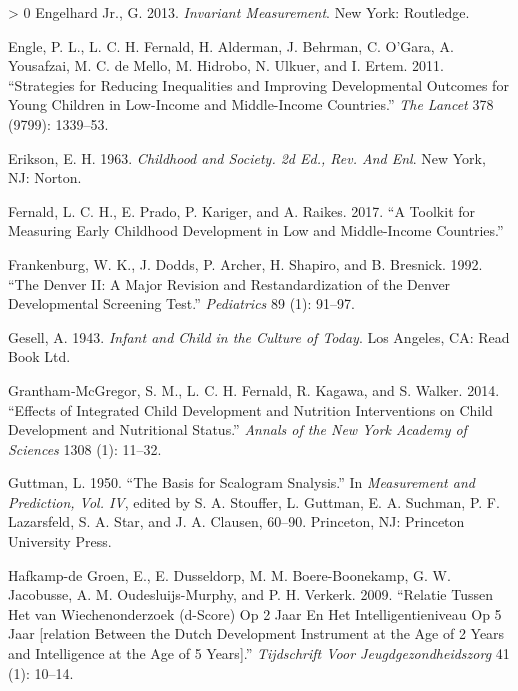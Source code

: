\documentclass[
]{book}
\newlength{\cslhangindent}
\newenvironment{CSLReferences}[3] %
 {%
  \setlength{\parindent}{0pt}
  \ifodd #1 \everypar{\setlength{\hangindent}{\cslhangindent}}\ignorespaces\fi
  \ifnum #2 > 0
  \setlength{\parskip}{#2\baselineskip}
  \fi
 }%
 {}
\begin{document}
\begin{CSLReferences}{1}{0}
\leavevmode\hypertarget{ref-engelhard2013}{}%
Engelhard Jr., G. 2013. \emph{Invariant Measurement}. New York: Routledge.

\leavevmode\hypertarget{ref-engle2011}{}%
Engle, P. L., L. C. H. Fernald, H. Alderman, J. Behrman, C. O'Gara, A. Yousafzai, M. C. de Mello, M. Hidrobo, N. Ulkuer, and I. Ertem. 2011. {``Strategies for Reducing Inequalities and Improving Developmental Outcomes for Young Children in Low-Income and Middle-Income Countries.''} \emph{The Lancet} 378 (9799): 1339--53.

\leavevmode\hypertarget{ref-erikson1963}{}%
Erikson, E. H. 1963. \emph{Childhood and Society. 2d Ed., Rev. And Enl}. New York, NJ: Norton.

\leavevmode\hypertarget{ref-fernald2017toolkit}{}%
Fernald, L. C. H., E. Prado, P. Kariger, and A. Raikes. 2017. {``A Toolkit for Measuring Early Childhood Development in Low and Middle-Income Countries.''}

\leavevmode\hypertarget{ref-frankenburg1992}{}%
Frankenburg, W. K., J. Dodds, P. Archer, H. Shapiro, and B. Bresnick. 1992. {``The Denver II: A Major Revision and Restandardization of the Denver Developmental Screening Test.''} \emph{Pediatrics} 89 (1): 91--97.

\leavevmode\hypertarget{ref-gesell1943}{}%
Gesell, A. 1943. \emph{Infant and Child in the Culture of Today}. Los Angeles, CA: Read Book Ltd.

\leavevmode\hypertarget{ref-grantham2014}{}%
Grantham‐McGregor, S. M., L. C. H. Fernald, R. Kagawa, and S. Walker. 2014. {``Effects of Integrated Child Development and Nutrition Interventions on Child Development and Nutritional Status.''} \emph{Annals of the New York Academy of Sciences} 1308 (1): 11--32.

\leavevmode\hypertarget{ref-guttman1950}{}%
Guttman, L. 1950. {``The Basis for Scalogram Snalysis.''} In \emph{Measurement and Prediction, Vol. IV}, edited by S. A. Stouffer, L. Guttman, E. A. Suchman, P. F. Lazarsfeld, S. A. Star, and J. A. Clausen, 60--90. Princeton, NJ: Princeton University Press.

\leavevmode\hypertarget{ref-hafkamp2009}{}%
Hafkamp-de Groen, E., E. Dusseldorp, M. M. Boere-Boonekamp, G. W. Jacobusse, A. M. Oudesluijs-Murphy, and P. H. Verkerk. 2009. {``Relatie Tussen Het van Wiechenonderzoek (d-Score) Op 2 Jaar En Het Intelligentieniveau Op 5 Jaar {[}relation Between the Dutch Development Instrument at the Age of 2 Years and Intelligence at the Age of 5 Years{]}.''} \emph{Tijdschrift Voor Jeugdgezondheidszorg} 41 (1): 10--14.


\end{CSLReferences}
\end{document}
